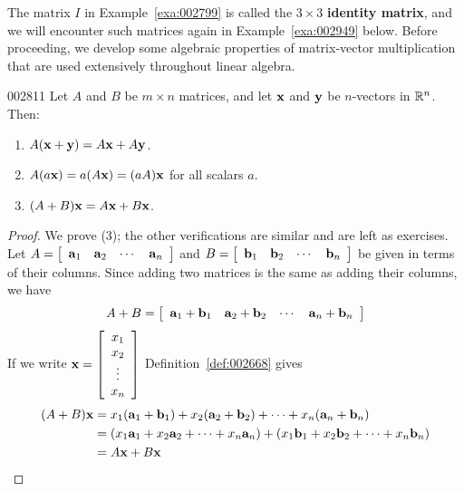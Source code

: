 The matrix $I$ in Example~\ref{exa:002799} is called the $3 \times 3$ \textbf{identity matrix}, and we will encounter such matrices again in Example~\ref{exa:002949} below. Before proceeding, we develop some algebraic properties of matrix-vector multiplication that are used extensively throughout linear algebra.

\begin{theorem}{}{002811}
Let $A$ and $B$ be $m \times n$ matrices, and let $\textbf{x}$ and $\textbf{y}$ be $n$-vectors in $\mathbb{R}^n$. Then:


\begin{enumerate}
\item $A(\textbf{x} + \textbf{y}) = A\textbf{x} + A\textbf{y}$.

\item $A(a\textbf{x}) = a(A\textbf{x}) = (aA)\textbf{x}$ for all scalars $a$.

\item $(A + B)\textbf{x} = A\textbf{x} + B\textbf{x}$.

\end{enumerate}
\end{theorem}

\begin{proof}
We prove (3); the other verifications are similar and are left as exercises. Let $A = \left[ \begin{array}{cccc}
\textbf{a}_{1} & \textbf{a}_{2} & \cdots & \textbf{a}_{n}
\end{array} \right]$ and $B = \left[ \begin{array}{cccc}
\textbf{b}_{1} & \textbf{b}_{2} & \cdots & \textbf{b}_{n}
\end{array} \right]$ be given in terms of their columns. Since adding two matrices is the same as adding their columns, we have
\begin{equation*}
A + B = \left[ \begin{array}{cccc}
\textbf{a}_{1} + \textbf{b}_{1} & \textbf{a}_{2} + \textbf{b}_{2} & \cdots & \textbf{a}_{n} + \textbf{b}_{n}
\end{array} \right]
\end{equation*}
If we write $\textbf{x} = \left[ \begin{array}{c}
x_{1} \\
x_{2} \\
\vdots \\
x_{n}
\end{array} \right]$
Definition~\ref{def:002668} gives
\begin{align*}
(A + B)\textbf{x} &= x_{1}(\textbf{a}_{1} + \textbf{b}_{1}) + x_{2}(\textbf{a}_{2} + \textbf{b}_{2}) + \dots + x_{n}(\textbf{a}_{n} + \textbf{b}_{n}) \\
&= (x_{1}\textbf{a}_{1} + x_{2}\textbf{a}_{2} + \dots + x_{n}\textbf{a}_{n}) + (x_{1}\textbf{b}_{1} + x_{2}\textbf{b}_{2} + \dots + x_{n}\textbf{b}_{n})\\
&= A\textbf{x} + B\textbf{x}
\end{align*}
\end{proof}

